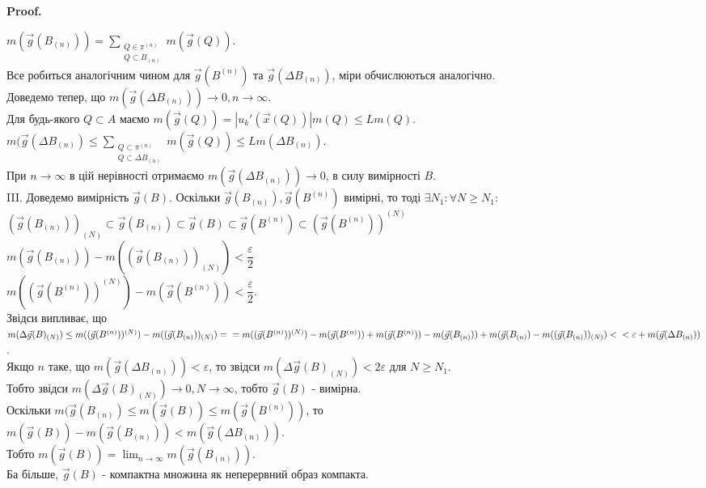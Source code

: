 \documentclass[a4paper, 10pt]{article}
\makeatletter
\def\qed{$\blacksquare$}
\theoremstyle{theoremdd}
\theoremstyle{theoremdd}
\theoremstyle{theoremdd}
\theoremstyle{theoremdd}
\theoremstyle{theoremdd}
\theoremstyle{theoremdd}
\theoremstyle{theoremdd}
\theoremstyle{theoremdd}
\renewenvironment{proof}[1][Proof.\\]{\par
\pushQED{\hfill \qed}%
\normalfont \topsep6\p@\@plus6\p@\relax
\trivlist
\item\relax
{\bfseries
#1\@addpunct{.}}\hspace\labelsep\ignorespaces
}{%
\popQED\endtrivlist\@endpefalse
}
\makeatother
\begin{document}
\begin{proof}
$m(\vec{g}(B_{(n)})) = \displaystyle\sum_{\substack{Q \in \pi^{(n)} \\ Q \subset B_{(n)}}} m(\vec{g}(Q))$.\\
Все робиться аналогічним чином для $\vec{g}(B^{(n)})$ та $\vec{g}(\Delta B_{(n)})$, міри обчислюються аналогічно.\\
Доведемо тепер, що $m(\vec{g}(\Delta B_{(n)})) \to 0, n \to \infty$.\\
Для будь-якого $Q \subset A$ маємо $m(\vec{g}(Q)) = |u_k'(\vec{x}(Q))| m(Q) \leq Lm(Q)$.\\
$m(\vec{g}(\Delta B_{(n)}) \leq \displaystyle\sum_{\substack{Q \subset \pi^{(n)} \\ Q \subset \Delta B_{(n)}}} m(\vec{g}(Q)) \leq Lm(\Delta B_{(n)})$.\\
При $n \to \infty$ в цій нерівності отримаємо $m(\vec{g}(\Delta B_{(n)})) \to 0$, в силу вимірності $B$.
\bigskip \\
III. Доведемо вимірність $\vec{g}(B)$. Оскільки $\vec{g}(B_{(n)}), \vec{g}(B^{(n)})$ вимірні, то тоді $\exists N_1: \forall N \geq N_1:$\\
$( \vec{g}(B_{(n)}) )_{(N)} \subset \vec{g}(B_{(n)}) \subset \vec{g}(B) \subset \vec{g}(B^{(n)}) \subset ( \vec{g}(B^{(n)}) )^{(N)}$\\
$m(\vec{g}(B_{(n)})) - m((\vec{g}(B_{(n)}))_{(N)}) < \dfrac{\varepsilon}{2}$\\
$m((\vec{g}(B^{(n)}))^{(N)}) - m(\vec{g}(B^{(n)})) < \dfrac{\varepsilon}{2}$.\\
Звідси випливає, що\\
$m(\Delta \vec{g}(B)_{(N)}) \leq m(( \vec{g}(B^{(n)}) )^{(N)}) - m(( \vec{g}(B_{(n)}) )_{(N)}) = \\
= m((\vec{g}(B^{(n)}))^{(N)}) - m(\vec{g}(B^{(n)})) + m(\vec{g}(B^{(n)})) - m(\vec{g}(B_{(n)})) + m(\vec{g}(B_{(n)}) - m((\vec{g}(B_{(n)}))_{(N)}) <\\ < \varepsilon + m(\vec{g}(\Delta B_{(n)}))$.\\
Якщо $n$ таке, що $m(\vec{g}(\Delta B_{(n)})) < \varepsilon$, то звідси $m(\Delta \vec{g}(B)_{(N)}) < 2\varepsilon$ для $N \geq N_1$.\\
Тобто звідси $m(\Delta \vec{g}(B)_{(N)}) \to 0, N \to \infty$, тобто $\vec{g}(B)$ - вимірна.\\
Оскільки $m(\vec{g}(B_{(n)}) \leq m(\vec{g}(B)) \leq m(\vec{g}(B^{(n)}))$, то\\
$m(\vec{g}(B)) - m(\vec{g}(B_{(n)})) < m(\vec{g}(\Delta B_{(n)}))$.\\
Тобто $m(\vec{g}(B)) =\displaystyle \lim_{n \to \infty} m (\vec{g}(B_{(n)}))$.\\
Ба більше, $\vec{g}(B)$ - компактна множина як неперервний образ компакта.
\end{proof}
\end{document}

